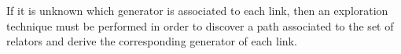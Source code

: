 \label{sec:anexo}

If it is unknown which generator is associated to each link, then an exploration technique must be performed in order to discover a path associated to the set of relators and derive the corresponding generator of each link.





